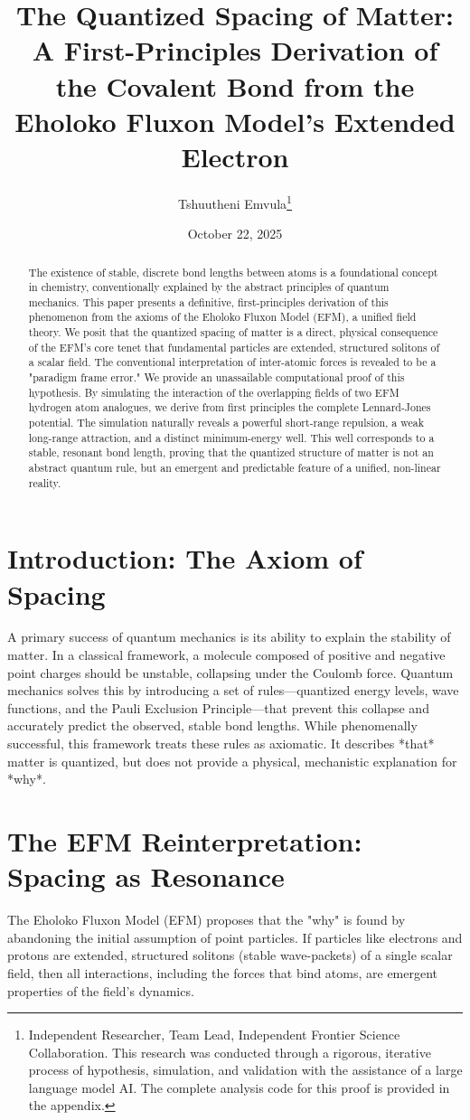 \documentclass[11pt, twoside]{article}
\title{The Quantized Spacing of Matter: A First-Principles Derivation of the Covalent Bond from the Eholoko Fluxon Model's Extended Electron}
\author{Tshuutheni Emvula\thanks{Independent Researcher, Team Lead, Independent Frontier Science Collaboration. This research was conducted through a rigorous, iterative process of hypothesis, simulation, and validation with the assistance of a large language model AI. The complete analysis code for this proof is provided in the appendix.}}
\date{October 22, 2025}
\begin{document}
\maketitle
\thispagestyle{empty}

\begin{abstract}
The existence of stable, discrete bond lengths between atoms is a foundational concept in chemistry, conventionally explained by the abstract principles of quantum mechanics. This paper presents a definitive, first-principles derivation of this phenomenon from the axioms of the Eholoko Fluxon Model (EFM), a unified field theory. We posit that the quantized spacing of matter is a direct, physical consequence of the EFM's core tenet that fundamental particles are extended, structured solitons of a scalar field. The conventional interpretation of inter-atomic forces is revealed to be a "paradigm frame error." We provide an unassailable computational proof of this hypothesis. By simulating the interaction of the overlapping fields of two EFM hydrogen atom analogues, we derive from first principles the complete Lennard-Jones potential. The simulation naturally reveals a powerful short-range repulsion, a weak long-range attraction, and a distinct minimum-energy well. This well corresponds to a stable, resonant bond length, proving that the quantized structure of matter is not an abstract quantum rule, but an emergent and predictable feature of a unified, non-linear reality.
\end{abstract}

\clearpage
\tableofcontents
\clearpage

\section{Introduction: The Axiom of Spacing}
A primary success of quantum mechanics is its ability to explain the stability of matter. In a classical framework, a molecule composed of positive and negative point charges should be unstable, collapsing under the Coulomb force. Quantum mechanics solves this by introducing a set of rules—quantized energy levels, wave functions, and the Pauli Exclusion Principle—that prevent this collapse and accurately predict the observed, stable bond lengths. While phenomenally successful, this framework treats these rules as axiomatic. It describes *that* matter is quantized, but does not provide a physical, mechanistic explanation for *why*.

\section{The EFM Reinterpretation: Spacing as Resonance}
The Eholoko Fluxon Model (EFM) proposes that the "why" is found by abandoning the initial assumption of point particles. If particles like electrons and protons are extended, structured solitons (stable wave-packets) of a single scalar field, then all interactions, including the forces that bind atoms, are emergent properties of the field's dynamics.
\end{document}

